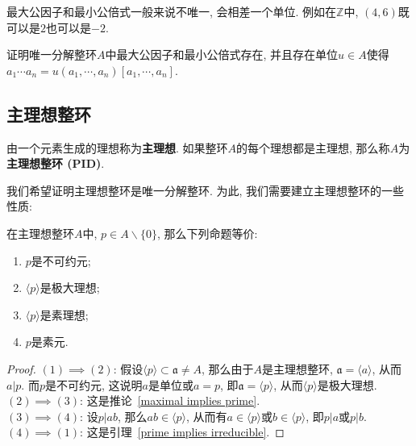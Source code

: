 最大公因子和最小公倍式一般来说不唯一, 会相差一个单位.
例如在$\mathbb{Z}$中, $(4,6)$既可以是$2$也可以是$-2$.

\begin{ex}
    证明唯一分解整环$A$中最大公因子和最小公倍式存在, 并且存在单位$u\in A$使得$a_1\cdots a_n=u(a_1,\cdots,a_n)[a_1,\cdots,a_n]$.
\end{ex}

\subsection{主理想整环}

\begin{defn}
    由一个元素生成的理想称为\textbf{主理想}.
    如果整环$A$的每个理想都是主理想, 那么称$A$为\textbf{主理想整环 (PID)}.
\end{defn}

我们希望证明主理想整环是唯一分解整环.
为此, 我们需要建立主理想整环的一些性质:

\begin{prop}\label{PID 1}
    在主理想整环$A$中, $p\in A\backslash\{0\}$, 那么下列命题等价:
    \begin{enumerate}[\rm (1)]
        \item $p$是不可约元;
        \item $\langle p\rangle$是极大理想;
        \item $\langle p\rangle$是素理想;
        \item $p$是素元.
    \end{enumerate}
\end{prop}
\begin{proof}
    $(1)\implies(2)$: 假设$\langle p\rangle\subset\mathfrak{a}\neq A$, 那么由于$A$是主理想整环, $\mathfrak{a}=\langle a\rangle$, 从而$a|p$.
    而$p$是不可约元, 这说明$a$是单位或$a=p$, 即$\mathfrak{a}=\langle p\rangle$, 从而$\langle p\rangle$是极大理想.\\
    $(2)\implies(3)$: 这是推论~\ref{maximal implies prime}.\\
    $(3)\implies(4)$: 设$p|ab$, 那么$ab\in\langle p\rangle$, 从而有$a\in\langle p\rangle$或$b\in\langle p\rangle$, 即$p|a$或$p|b$.\\
    $(4)\implies(1)$: 这是引理~\ref{prime implies irreducible}.
\end{proof}


